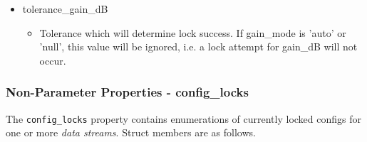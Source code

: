 \documentclass{article}
\begin{document}
\begin{itemize}
\begin{itemize}
\begin{itemize}
            \item tolerance\_gain\_dB
              \begin{itemize}
                \item Tolerance which will determine lock success.
                If gain\_mode is 'auto' or 'null', this value will be ignored, i.e. a
                lock attempt for gain\_dB will not occur.
              \end{itemize}
          \end{itemize}
      \end{itemize}
  \end{itemize}


  \subsubsection{Non-Parameter Properties - config\_locks}
  The \verb+config_locks+ property contains
  enumerations of currently locked configs for one or more
  \textit{data streams}.
  Struct
  members are as follows.
\end{document}
